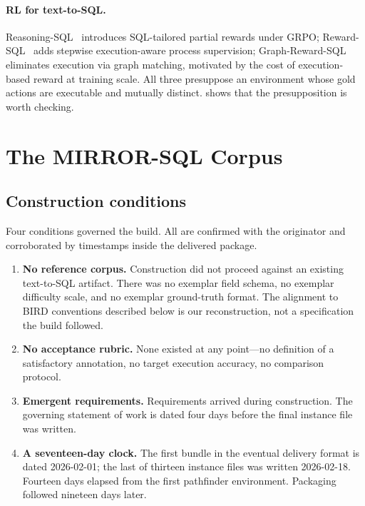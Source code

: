 \documentclass[11pt,letterpaper]{article}
\theoremstyle{definition}
\theoremstyle{plain}
\theoremstyle{remark}
\begin{document}
\paragraph{RL for text-to-SQL.}
Reasoning-SQL~\cite{pourreza2025reasoningsql} introduces SQL-tailored partial rewards under
GRPO; Reward-SQL~\cite{zhang2025rewardsql} adds stepwise execution-aware process supervision;
Graph-Reward-SQL~\cite{graphrewardsql2025} eliminates execution via graph matching, motivated
by the cost of execution-based reward at training scale. All three presuppose an environment
whose gold actions are executable and mutually distinct.  shows that the
presupposition is worth checking.

\section{The MIRROR-SQL Corpus}
\label{sec:corpus}

\subsection{Construction conditions}
\label{sec:conditions}

Four conditions governed the build. All are confirmed with the originator and corroborated by
timestamps inside the delivered package.

\begin{enumerate}[leftmargin=1.5em,itemsep=2pt,topsep=3pt]
  \item \textbf{No reference corpus.} Construction did not proceed against an existing
        text-to-SQL artifact. There was no exemplar field schema, no exemplar difficulty
        scale, and no exemplar ground-truth format. The alignment to BIRD conventions
        described below is our reconstruction, not a specification the build followed.
  \item \textbf{No acceptance rubric.} None existed at any point---no definition of a
        satisfactory annotation, no target execution accuracy, no comparison protocol.
  \item \textbf{Emergent requirements.} Requirements arrived during construction. The
        governing statement of work is dated four days before the final instance file was
        written.
  \item \textbf{A seventeen-day clock.} The first bundle in the eventual delivery format is
        dated 2026-02-01; the last of thirteen instance files was written 2026-02-18. Fourteen
        days elapsed from the first pathfinder environment. Packaging followed nineteen days
        later.
\end{enumerate}
\end{document}

